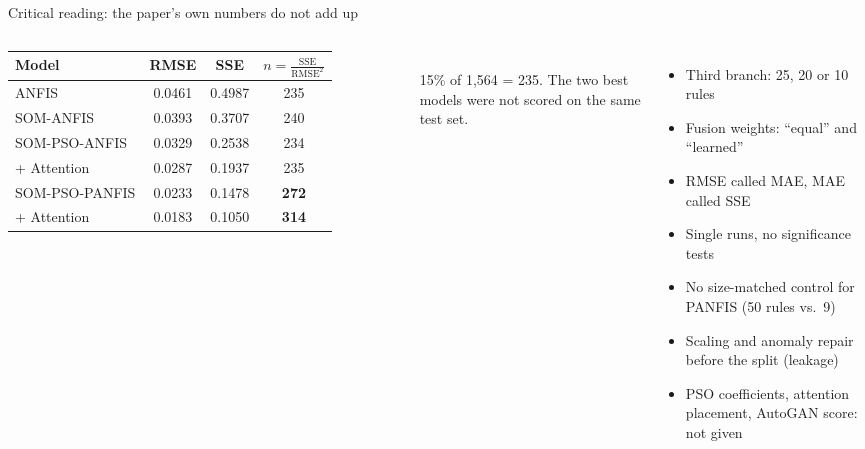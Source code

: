 \documentclass[aspectratio=169,10pt]{beamer}
\begin{document}
\begin{frame}{Critical reading: the paper's own numbers do not add up}
\begin{columns}[T]
\scriptsize
\begin{tabular}{lccc}
\toprule Model & RMSE & SSE & $n=\frac{\mathrm{SSE}}{\mathrm{RMSE}^2}$ \\ \midrule
ANFIS & 0.0461 & 0.4987 & 235 \\ SOM-ANFIS & 0.0393 & 0.3707 & 240 \\ SOM-PSO-ANFIS & 0.0329 & 0.2538 & 234 \\ + Attention & 0.0287 & 0.1937 & 235 \\ SOM-PSO-PANFIS & 0.0233 & 0.1478 & \textcolor{warm}{\textbf{272}} \\ + Attention & 0.0183 & 0.1050 & \textcolor{warm}{\textbf{314}} \\ \bottomrule
\end{tabular}\\[2mm]
\normalsize 15\% of 1,564 = 235. The two best models were not scored on the same test set.
\begin{itemize}\setlength\itemsep{1mm}
\item Third branch: 25, 20 or 10 rules
\item Fusion weights: ``equal'' and ``learned''
\item RMSE called MAE, MAE called SSE
\item Single runs, no significance tests
\item No size-matched control for PANFIS (50 rules vs.\ 9)
\item Scaling and anomaly repair before the split (leakage)
\item PSO coefficients, attention placement, AutoGAN score: not given
\end{itemize}
\end{columns}
\end{frame}
\end{document}
